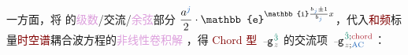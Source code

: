 一方面，将  的\textcolor{Plum}{级数}/\textcolor{NavyBlue}{交流}/\textcolor{Plum}{余弦}部分 $\dfrac{a^{\textcolor{NavyBlue}{j}}}{2} \cdot \mathbb{e}^{\mathbb{i} {\frac{b_{\textcolor{NavyBlue}{j}} \pm 1}{b_{\textcolor{NavyBlue}{j}}}} x}$，代入\textcolor{Maroon}{和频}标量\textcolor{Maroon}{时空谱}耦合波方程的\textcolor{Plum}{非线性卷积解} ，得 \textcolor{Maroon}{Chord 型} $\xint{\begin{smallmatrix} ~ \\ {}^{}_{\mathcolor{gray}{-}} \\ ~ \end{smallmatrix}}{09}{\mathtt{g}}^{\;\! \textcolor{PineGreen}{\hat{3}}}_{\;\! \mathcolor{gray}{z}}$ 的\textcolor{NavyBlue}{交流项} $\xint{\begin{smallmatrix} ~ \\ {}^{}_{\mathcolor{gray}{-}} \\ ~ \end{smallmatrix}}{09}{\mathtt{g}}^{\;\! \textcolor{PineGreen}{\hat{3}};\text{\textcolor{Maroon}{chord}}}_{\;\! \mathcolor{gray}{z};\text{\textcolor{NavyBlue}{AC}}}$：
